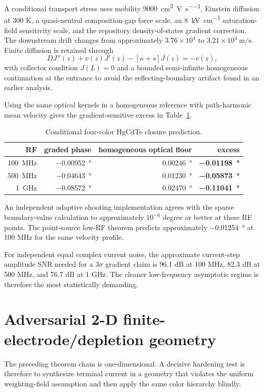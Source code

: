 \documentclass[11pt]{article}
\begin{document}
A conditional transport stress uses mobility \SI{9000}{\centi\meter^2\per\volt\per\second}, Einstein diffusion at 300 K, a quasi-neutral composition-gap force scale, an \SI{8}{kV\per\centi\meter} saturation-field sensitivity scale, and the repository density-of-states gradient correction. The downstream drift changes from approximately $3.76\times10^4$ to $3.21\times10^4\ \mathrm{m/s}$. Finite diffusion is retained through
\begin{equation}
D J''(z)+v(z)J'(z)-[\kappa+s]J(z)=-v(z),
\end{equation}
with collector condition $J(L)=0$ and a bounded semi-infinite homogeneous continuation at the entrance to avoid the reflecting-boundary artifact found in an earlier analysis.

Using the same optical kernels in a homogeneous reference with path-harmonic mean velocity gives the gradient-sensitive excess in Table~\ref{tab:hg}.
\begin{table}[h]
\centering
\caption{Conditional four-color HgCdTe closure prediction.}
\label{tab:hg}
\begin{tabular}{rrrr}
\toprule
RF & graded phase & homogeneous optical floor & excess \\
\midrule
\SI{100}{MHz} & \SI{-0.00952}{\degree} & \SI{+0.00246}{\degree} & \textbf{\SI{-0.01198}{\degree}} \\
\SI{500}{MHz} & \SI{-0.04643}{\degree} & \SI{+0.01230}{\degree} & \textbf{\SI{-0.05873}{\degree}} \\
\SI{1}{GHz} & \SI{-0.08572}{\degree} & \SI{+0.02470}{\degree} & \textbf{\SI{-0.11041}{\degree}} \\
\bottomrule
\end{tabular}
\end{table}
An independent adaptive shooting implementation agrees with the sparse boundary-value calculation to approximately $10^{-6}$ degree or better at these RF points. The point-source low-RF theorem predicts approximately \SI{-0.01254}{\degree} at 100 MHz for the same velocity profile.

For independent equal complex current noise, the approximate current-step amplitude SNR needed for a $3\sigma$ gradient claim is 96.1 dB at 100 MHz, 82.3 dB at 500 MHz, and 76.7 dB at 1 GHz. The cleaner low-frequency asymptotic regime is therefore the most statistically demanding.

\section{Adversarial 2-D finite-electrode/depletion geometry}
The preceding theorem chain is one-dimensional. A decisive hardening test is therefore to synthesize terminal current in a geometry that violates the uniform weighting-field assumption and then apply the same color hierarchy blindly.
\end{document}
